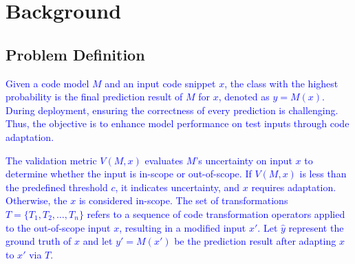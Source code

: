\section{Background}
\label{background}




\subsection{Problem Definition}

\textcolor{blue}{Given a code model \( M \) and an input code snippet \( x \), the class with the highest probability is the final prediction result of \( M \) for \( x \), denoted as \(y = M(x) \). During deployment, ensuring the correctness of every prediction is challenging. Thus, the objective is to enhance model performance on test inputs through code adaptation.} 

\textcolor{blue}{The validation metric \(V(M,x)\)  evaluates \(M\)'s uncertainty on input \(x\) to determine whether the input is in-scope or out-of-scope. If \(V(M,x)\) is less than the predefined threshold \(c\), it indicates uncertainty, and \(x\) requires adaptation. Otherwise, the \(x\) is considered in-scope. The set of transformations \(T = \{T_1, T_2, \ldots, T_n\}\) refers to a sequence of code transformation operators applied to the out-of-scope input \(x\), resulting in a modified input \(x'\).} \textcolor{blue}{Let \( \hat y \) represent the ground truth of \( x \) and let \( y' = M(x') \) be the prediction result after adapting \( x \) to \( x' \) via  \( T \).} 


